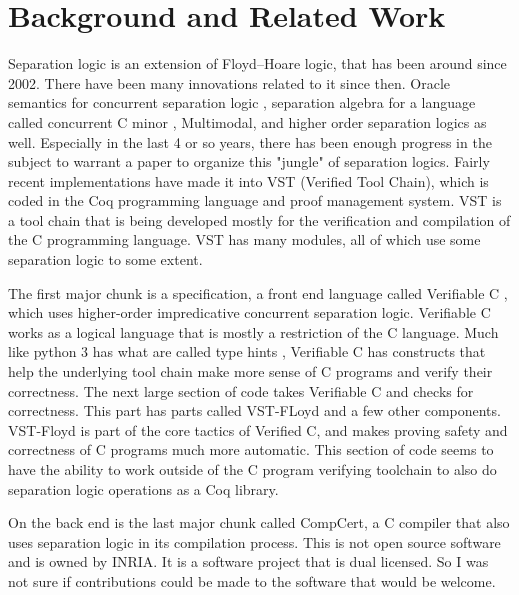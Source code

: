 \section{Background and Related Work}
\label{sec:background_and_related_work}

Separation logic is an extension of Floyd–Hoare logic, that has been around since 2002. \cite{reynolds_separation_2002} There have been many innovations related to it since then. Oracle semantics for concurrent separation logic \cite{drossopoulou_oracle_2008}, separation algebra for a language called concurrent C minor \cite{hutchison_fresh_2009},  Multimodal, and higher order separation logics as well. \cite{dockins_multimodal_2008,noauthor_higher_nodate} Especially in the last 4 or so years, there has been enough progress in the subject to warrant a paper to organize this "jungle" of separation logics. \cite{chang_bringing_2017} Fairly recent implementations have made it into VST (Verified Tool Chain), which is coded in the Coq programming language and proof management system. \cite{hutchison_verified_2012} VST is a tool chain that is being developed mostly for the verification and compilation of the C programming language. VST has many modules, all of which use some separation logic to some extent. 

The first major chunk is a specification, a front end language called Verifiable C \cite{noauthor_verifiable_nodate}, which uses higher-order impredicative concurrent separation logic. Verifiable C works as a logical language that is mostly a restriction of the C language. Much like python 3 has what are called type hints \cite{noauthor_typing_nodate}, Verifiable C has constructs that help the underlying tool chain make more sense of C programs and verify their correctness. The next large section of code takes Verifiable C and checks for correctness. This part has parts called VST-FLoyd and a few other components. VST-Floyd is part of the core tactics of Verified C, and makes proving safety and correctness of C programs much more automatic. This section of code seems to have the ability to work outside of the C program verifying toolchain to also do separation logic operations as a Coq library. \cite{noauthor_princetonuniversityvst_2021}

On the back end is the last major chunk called CompCert, a C compiler that also uses separation logic in its compilation process. \cite{noauthor_compcert_nodate} This is not open source software and is owned by INRIA. It is a software project that is dual licensed. So I was not sure if contributions could be made to the software that would be welcome.

